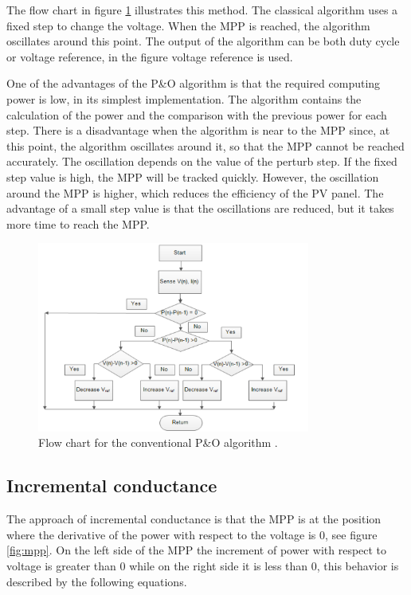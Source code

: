 The flow chart in figure \ref{fcperturbandobserve} illustrates this method. The classical algorithm uses a fixed step to change the voltage. When the MPP is reached, the algorithm oscillates around this point. The output of the algorithm can be both duty cycle or voltage reference, in the figure voltage reference is used. \cite{flowchartVC}

One of the advantages of the P\&O algorithm is that the required computing power is  low, in its simplest implementation. The algorithm contains the calculation of the power and the comparison with the previous power for each step. There is a disadvantage when the algorithm is near to the MPP since, at this point, the algorithm oscillates around it, so that the MPP cannot be reached accurately. The oscillation depends on the value of the perturb step. If the fixed step value is high, the MPP will be tracked quickly. However, the oscillation around the MPP is higher, which reduces the efficiency of the PV panel. The advantage of a small step value is that the oscillations are reduced, but it takes more time to reach the MPP. \cite{AN1521_MC}

\begin{figure}[H]
	\begin{center}
		\includegraphics[width=0.8\textwidth]{../Pictures/P1/Flow_chart/flow_chart_perturb_observe}
		\caption{Flow chart for the conventional P\&O algorithm \cite{PerturbObserveFC}.}
		\label{fcperturbandobserve}
	\end{center}	
\end{figure}

\iffalse
\subsection{Incremental conductance}
The approach of incremental conductance is that the MPP is at the position where the derivative of the power with respect to the voltage is 0, see figure \ref{fig:mpp}. On the left side of the MPP the increment of power with respect to voltage is greater than 0 while on the right side it is less than 0, this behavior is described by the following equations. \cite{AN1521_MC}

